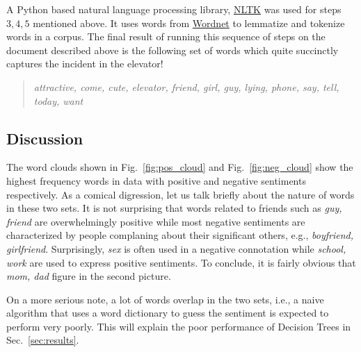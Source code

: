 \documentclass[11pt, letterpaper, conference, final, twocolumn]{ieeeconf}
\begin{document}
A Python based natural language processing library, \href{http://www.nltk.org}{NLTK} was used for steps $3,4,5$ mentioned above. It uses words from \href{http://wordnet.princeton.edu}{Wordnet} to lemmatize and tokenize words in a corpus. The final result of running this sequence of steps on the document described above is the following set of words which quite succinctly captures the incident in the elevator!
\begin{quote}
\emph{attractive, come, cute, elevator, friend, girl, guy, lying, phone, say, tell, today, want}
\end{quote}

\subsection{Discussion}
\label{ssec:discussion}

The word clouds shown in Fig.~\ref{fig:pos_cloud} and Fig.~\ref{fig:neg_cloud} show the highest frequency words in data with positive and negative sentiments respectively. As a comical digression, let us talk briefly about the nature of words in these two sets. It is not surprising that words related to friends such as \emph{guy, friend} are overwhelmingly positive while most negative sentiments are characterized by people complaning about their significant others, e.g., \emph{boyfriend, girlfriend}. Surprisingly, \emph{sex} is often used in a negative connotation while \emph{school, work} are used to express positive sentiments. To conclude, it is fairly obvious that \emph{mom, dad} figure in the second picture.

On a more serious note, a lot of words overlap in the two sets, i.e., a naive algorithm that uses a word dictionary to guess the sentiment is expected to perform very poorly. This will explain the poor performance of Decision Trees in Sec.~\ref{sec:results}.
\end{document}
